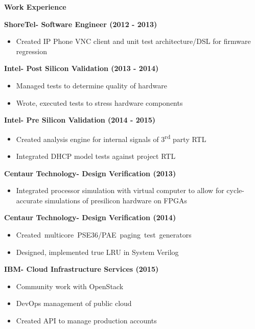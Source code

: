 \documentclass{report}
\begin{document}
\textbf{Work Experience} \\
\begin{paracol}{2}
  \textbf{ShoreTel- Software Engineer (2012 - 2013)}
  \begin{itemize}[label=$\circ$]
  \item Created IP Phone VNC client and unit test architecture/DSL for firmware
    regression
  \end{itemize}

  \textbf{Intel- Post Silicon Validation (2013 - 2014)}
  \begin{itemize}[label=$\circ$]
  \item Managed tests to determine quality of hardware
  \item Wrote, executed tests to stress hardware components
  \end{itemize}
  
  \textbf{Intel- Pre Silicon Validation (2014 - 2015)}
  \begin{itemize}[label=$\circ$]
  \item Created analysis engine for internal signals of 3\textsuperscript{rd} party RTL
  \item Integrated DHCP model tests against project RTL
  \end{itemize}

  \switchcolumn{}
  \textbf{Centaur Technology- Design Verification (2013)}
  \begin{itemize}[label=$\circ$]
  \item Integrated processor simulation with virtual computer to allow for
    cycle-accurate simulations of presilicon hardware on FPGAs
  \end{itemize}

  \textbf{Centaur Technology- Design Verification (2014)}
  \begin{itemize}[label=$\circ$]
  \item \mbox{Created multicore PSE36/PAE paging test generators}
  \item Designed, implemented true LRU in System Verilog
  \end{itemize}
  
  \textbf{IBM- Cloud Infrastructure Services (2015)}
  \begin{itemize}[label=$\circ$]
  \item Community work with OpenStack
  \item DevOps management of public cloud
  \item Created API to manage production accounts
  \end{itemize}
\end{paracol}
\end{document}
